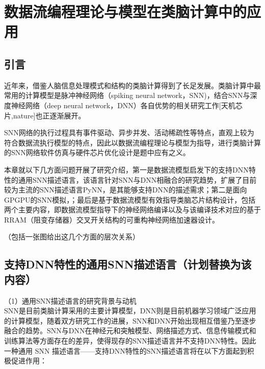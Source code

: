 \section{数据流编程理论与模型在类脑计算中的应用}
\subsection{引言}
近年来，借鉴人脑信息处理模式和结构的类脑计算得到了长足发展。类脑计算中最常用的计算模型是脉冲神经网络（spiking neural network，SNN)，结合SNN与深度神经网络（deep neural network，DNN）各自优势的相关研究工作[天机芯片,nature]也正逐渐展开。

SNN网络的执行过程具有事件驱动、异步并发、活动稀疏性等特点，直观上较为符合数据流执行模型的特点，因此以数据流编程理论与模型为指导，进行类脑计算的SNN网络软件仿真与硬件芯片优化设计是题中应有之义。

本章就以下几方面问题开展了研究介绍，第一是数据流模型启发下的支持DNN特性的通用SNN描述语言，该语言针对SNN与DNN相融合的研究趋势，扩展了目前较为主流的SNN描述语言PyNN，是其能够支持DNN的描述需求；第二是面向GPGPU的SNN模拟，；最后是基于数据流模型有效指导类脑芯片结构设计，包括两个主要内容，即数据流模型指导下的神经网络编译以及与该编译技术对应的基于RRAM（阻变存储器）交叉开关结构的可重构神经网络加速器设计。

（包括一张图给出这几个方面的层次关系）


\subsection{支持DNN特性的通用SNN描述语言（计划替换为该内容）}
（1）通用SNN描述语言的研究背景与动机\\
SNN是目前类脑计算采用的主要计算模型，DNN则是目前机器学习领域广泛应用的计算模型，随着双方研究工作的进展，SNN和DNN开始出现相互借鉴乃至逐步融合的趋势。SNN与DNN在神经元和突触模型、网络描述方式、信息传输模式和训练算法等方面存在的差异，使得现存的SNN描述语言并不支持DNN特性。因此一种通用 SNN 描述语言——支持DNN特性的SNN描述语言将在以下方面起到积极促进作用：

